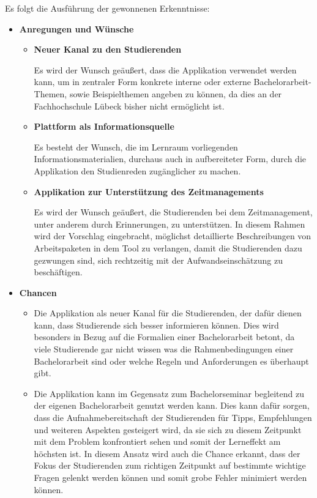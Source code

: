 \documentclass{scrreprt}
\begin{document}
\par\medskip Es folgt die Ausführung der gewonnenen Erkenntnisse:
\begin{itemize}
\item \textbf{Anregungen und Wünsche}
\begin{itemize}
\item \textbf{Neuer Kanal zu den Studierenden}
\par Es wird der Wunsch geäußert, dass die Applikation verwendet werden kann, um in zentraler Form konkrete interne oder externe Bachelorarbeit-Themen, sowie Beispielthemen angeben zu können, da dies an der Fachhochschule Lübeck bisher nicht ermöglicht ist.
\item \textbf{Plattform als Informationsquelle}
\par Es besteht der Wunsch, die im Lernraum vorliegenden Informationsmaterialien, durchaus auch in aufbereiteter Form, durch die Applikation den Studienreden zugänglicher zu machen.
\item \textbf{Applikation zur Unterstützung des Zeitmanagements}
\par Es wird der Wunsch geäußert, die Studierenden bei dem Zeitmanagement, unter anderem durch Erinnerungen, zu unterstützen. In diesem Rahmen wird der Vorschlag eingebracht, möglichst detaillierte Beschreibungen von Arbeitspaketen in dem Tool zu verlangen, damit die Studierenden dazu gezwungen sind, sich rechtzeitig mit der Aufwandseinschätzung zu beschäftigen.
\end{itemize}
\item \textbf{Chancen}
\begin{itemize}
\item Die Applikation als neuer Kanal für die Studierenden, der dafür dienen kann, dass Studierende sich besser informieren können. Dies wird besonders in Bezug auf die Formalien einer Bachelorarbeit betont, da viele Studierende gar nicht wissen was die Rahmenbedingungen einer Bachelorarbeit sind oder welche Regeln und Anforderungen es überhaupt gibt.
\item Die Applikation kann im Gegensatz zum Bachelorseminar begleitend zu der eigenen Bachelorarbeit genutzt werden kann. Dies kann dafür sorgen, dass die Aufnahmebereitschaft der Studierenden für Tipps, Empfehlungen und weiteren Aspekten gesteigert wird, da sie sich zu diesem Zeitpunkt mit dem Problem konfrontiert sehen und somit der Lerneffekt am höchsten ist. In diesem Ansatz wird auch die Chance erkannt, dass der Fokus der Studierenden zum richtigen Zeitpunkt auf bestimmte wichtige Fragen gelenkt werden können und somit grobe Fehler minimiert werden können.

\end{itemize}
\end{itemize}
\end{document}
